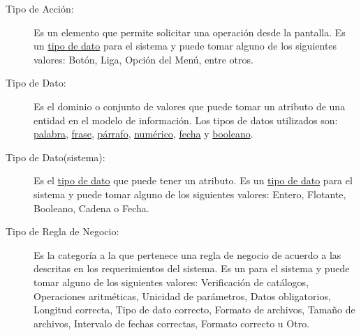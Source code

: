 \begin{description}
	\item[\hypertarget{tTipoAcc}{Tipo de Acción:}] Es un elemento que permite solicitar una operación desde la pantalla. Es un \hyperlink{tTipoDato}{tipo de dato} para el sistema y puede tomar alguno de los siguientes valores: Botón, Liga, Opción del Menú, entre otros.
	
	\item[\hypertarget{tTipoDato}{Tipo de Dato:}] Es el dominio o conjunto de valores que puede tomar un atributo de una entidad en el modelo de información. Los tipos de datos utilizados son: \hyperlink{tPalabra}{palabra}, \hyperlink{tFrase}{frase}, \hyperlink{tParrafo}{párrafo}, \hyperlink{tNumerico}{numérico}, \hyperlink{tFecha}{fecha} y \hyperlink{tBooleano}{booleano}.
	
	\item[\hypertarget{tTipoDatoP}{Tipo de Dato(sistema):}] Es el \hyperlink{tTipoDato}{tipo de dato} que puede tener un atributo. Es un \hyperlink{tTipoDato}{tipo de dato} para el sistema y puede tomar alguno de los siguientes valores: Entero, Flotante, Booleano, Cadena o Fecha.
	
	\item[\hypertarget{tTipoRN}{Tipo de Regla de Negocio:}] Es la categoría a la que pertenece una regla de negocio de acuerdo a las descritas en los requerimientos del sistema. Es un  para el sistema y puede tomar alguno de los siguientes valores: Verificación de catálogos, Operaciones aritméticas, Unicidad de parámetros, Datos obligatorios, Longitud correcta, Tipo de dato correcto, Formato de archivos, Tamaño de archivos, Intervalo de fechas correctas, Formato correcto u Otro.
	
\end{description}
